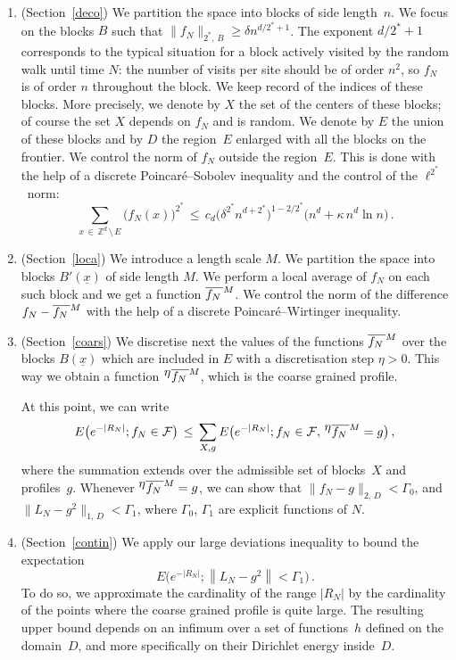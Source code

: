 \documentclass[AHL, Unicode, longabstracts, published]{cedram}
\newcommand{\xx}{{\underline{x}}}
\newcommand*\fmn{\overline{f_N\,}^{\lower2pt\hbox{$\scriptstyle M$}}}
\newcommand*\fmne{^{\displaystyle \eta}\overline{f_N\,}^{\lower2pt\hbox{$\scriptstyle M$}}}
\newcommand*\Zd {{\mathbb Z^d}}
\newcommand{\cF}{\mathcal{F}}
\begin{document}
\begin{enumerate}
\item \label{list.2.3.4}(Section~\ref{deco}) We partition the space into blocks of side length~$n$. We focus on the blocks $B$ such that $\|f_N\|_{2^*,\,B}\geq \delta n^{d/2^*+1}$. The exponent $d/2^*+1$ corresponds to the typical situation for a block actively visited by the random walk until time $N$: the number of visits per site should be of order $n^2$, so $f_N$ is of order $n$ throughout the block. We keep record of the indices of these blocks. More precisely, we denote by $X$ the set of the centers of these blocks; of course the set $X$ depends on $f_N$ and is random. We denote by $E$ the union of these blocks and by $D$ the region~$E$ enlarged with all the blocks on the frontier. We control the norm of $f_N$ outside the region~$E$. This is done with the help of a discrete Poincaré--Sobolev inequality and the control of the $\ell^{2^*}$~norm:
\begin{equation*}
\sum_{x\,\in\,
\Zd\,\setminus\,E}
\big(f_N(x)\big)^{2^*}\,\leq\, c_d\big(
\delta^{2^*} n^{d+2^*}
\big)^{1-2/2^*}
\big(n^d+ {\kappa \,n^d\ln n}
\big)\,.
\end{equation*}

\item \label{list.2.3.5}(Section~\ref{loca}) We introduce a length scale $M$. We partition the space into blocks $B'(\xx)$ of side length $M$. We perform a local average of $f_N$ on each such block and we get a function $\fmn$. We control the norm of the difference $f_N-\fmn$ with the help of a discrete Poincaré--Wirtinger inequality.


\item \label{list.2.3.6}(Section~\ref{coars}) We discretise next the values of the functions $\fmn$ over the blocks $B(\xx)$ which are included in $E$ with a discretisation step $\eta>0$. This way we obtain a function $\fmne$, which is the coarse grained profile.

At this point, we can write
\[
E\big(e^{-|R_N|};f_N\in\cF
\big)
\,\leq\,
\sum_{X,g} E\big(e^{-|R_N|}; f_N\in\cF,\,
\fmne=g
\big)\,,
\nonumber
\]
where the summation extends over the admissible set of blocks~$X$ and profiles~$g$. Whenever $\fmne=g$, we can show that $\|f_N-g\|_{2,\,D}<\Gamma_0$, and $\|L_N-g^2\|_{1,\,D}<\Gamma_1$, where $\Gamma_0$, $\Gamma_1$ are explicit functions of $N$.


\item \label{list.2.3.7}(Section~\ref{contin}) We apply our large deviations inequality to bound the expectation
\[
E\big(e^{-|R_N|};
\left\|L_N-g^2\right\|<\Gamma_1
\big)\,.
\]
To do so, we approximate the cardinality of the range $|R_N|$ by the cardinality of the points where the coarse grained profile is quite large. The resulting upper bound depends on an infimum over a set of functions~$h$ defined on the domain~$D$, and more specifically on their Dirichlet energy inside~$D$.


\end{enumerate}
\end{document}
